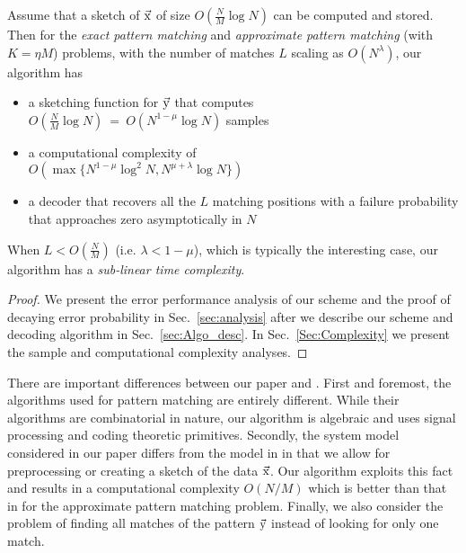 \begin{theorem}\label{thm:mainresults}
Assume that a sketch of $\vec{\mathrm{x}}$ of size $O(\frac{N}{M} \log N)$ can be computed and stored. Then for the {\it exact pattern matching} and {\it approximate pattern matching} (with $K = \eta M$) problems, with the number of matches $L$ scaling as $O(N^{\lambda})$, our algorithm has
\begin{itemize}
 \item a sketching function for $\vec{\mathrm{y}}$ that computes \\ $O(\frac{N}{M}\log N)~=~ O\left(N^{1-\mu}\log N\right)$ samples
  \item a computational complexity of \\$O\left(\max\{N^{1-\mu}\log^2 N, N^{\mu+\lambda}\log N \}\right)$
  \item a decoder that recovers all the $L$ matching positions with a failure probability that approaches zero asymptotically in $N$

 \end{itemize}
When $L<O\left(\frac{N}{M}\right)$ (i.e. $\lambda<1-\mu$), which is typically the interesting case, our algorithm has a {\it sub-linear time complexity}.
\end{theorem}
\begin{proof}
We present the error performance analysis of our scheme and the proof of decaying error probability in Sec.~\ref{sec:analysis} after we describe our scheme and  decoding algorithm in Sec.~\ref{sec:Algo_desc}. In Sec.~\ref{Sec:Complexity} we present the sample and computational complexity analyses.
\end{proof}

There are important differences between our paper and \cite{hassanieh2012faster,andoni2013shift,boyer1977fast,amir2004faster}. First and foremost, the algorithms used for pattern matching are entirely different. While their algorithms are combinatorial in nature, our algorithm is algebraic and uses signal processing and coding theoretic primitives. Secondly, the system model considered in our paper differs from the model in \cite{hassanieh2012faster,andoni2013shift,boyer1977fast,amir2004faster} in that we allow for preprocessing or creating a sketch of the data $\vec{\mathrm{x}}$. Our algorithm exploits this fact and results in a computational complexity $O(N/M)$ which is better than that in \cite{andoni2013shift} for the approximate pattern matching problem.  Finally, we also consider the problem of finding all matches of the pattern $\vec{\mathrm{y}}$ instead of looking for only one match.

